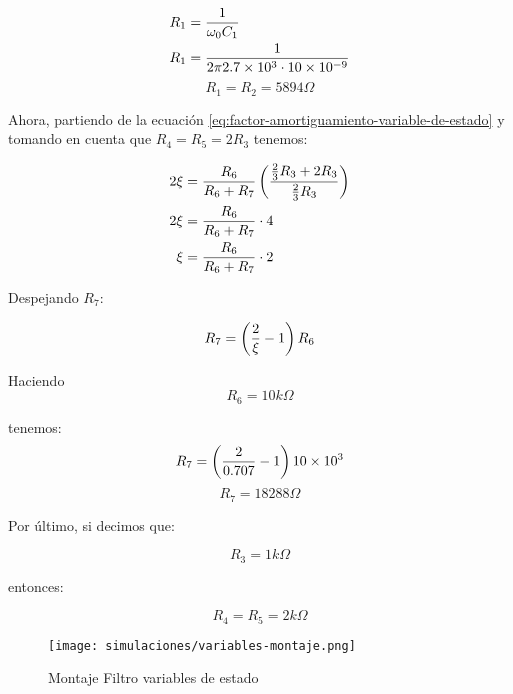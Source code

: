 \begin{align*}
    R_1 &= \frac{1}{\omega_0 C_1} \\
    R_1 &= \frac{1}{2\pi 2.7\times 10^3 \cdot 10\times 10^{-9}} \\
\end{align*}
\begin{equation}
    \boxed{R_1 = R_2 = 5894 \Omega}
\end{equation}

Ahora, partiendo de la ecuación \ref{eq:factor-amortiguamiento-variable-de-estado} y tomando en cuenta que $R_4 = R_5 = 2 R_3$ tenemos:

\begin{align*}
    2\xi &= \frac{R_6}{R_6 + R_7} \left( \frac{\frac{2}{3} R_3 + 2R_3}{\frac{2}{3} R_3} \right) \\
    2\xi &= \frac{R_6}{R_6 + R_7} \cdot 4  \\
    \xi &= \frac{R_6}{R_6 + R_7} \cdot 2 \\
\end{align*}

Despejando $R_7$:

\begin{align*}
    R_7 &= \left( \frac{2}{\xi} - 1 \right)R_6 \\
\end{align*}

Haciendo
 $$\boxed{R_6 = 10k\Omega}$$
 
tenemos:
\begin{align*}
    R_7 &= \left( \frac{2}{0.707} - 1 \right) 10\times 10^{3} \\
\end{align*}
\begin{equation}
    \boxed{R_7 = 18288\Omega}
\end{equation}

Por último, si decimos que:

$$\boxed{R_3 = 1k\Omega}$$

entonces:

\begin{equation*}
    \boxed{R_4 = R_5 = 2k\Omega}
\end{equation*}


\begin{figure}[ht]
    \centering
    \texttt{[image: simulaciones/variables-montaje.png]}
    \caption{Montaje Filtro variables de estado}\label{fig:sim-variables-montaje} 
\end{figure}

